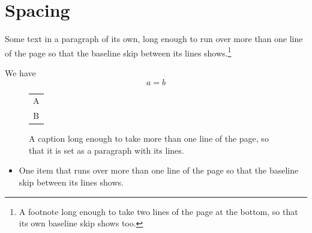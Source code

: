 \documentclass{article}
\begin{document}
\section{Spacing}
Some text in a paragraph of its own, long enough to run over more than one line of the page so that the
baseline skip between its lines shows.\footnote{A footnote long enough to take two lines of the page at the bottom, so that its own baseline skip shows too.}

We have
\begin{equation}
a = b
\end{equation}
\begin{figure}[h]
\centering
\begin{tabular}{c}A\\B\end{tabular}
\caption{A caption long enough to take more than one line of the page, so that it is set as a paragraph with its lines.}
\end{figure}
\begin{itemize}
\item One item that runs over more than one line of the page so that the baseline skip between its lines shows.
\end{itemize}
\end{document}
